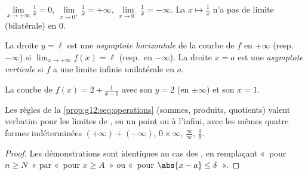 \begin{example}
$\lim\limits_{x\to+\infty} \frac{1}{x} = 0$,
$\lim\limits_{x\to 0^+} \frac{1}{x} = +\infty$,
$\lim\limits_{x\to 0^-} \frac{1}{x} = -\infty$. La 
$x \mapsto \frac1x$ n'a pas de limite (bilatérale) en $0$.
\end{example}

\begin{definition}[Asymptotes]\label{def:g12:limcont:asymptote}
La droite $y = \ell$ est une \emph{asymptote horizontale}
de la courbe de $f$ en $+\infty$ (resp.\ $-\infty$) si
$\lim_{x\to+\infty} f(x) = \ell$ (resp.\ en $-\infty$). La droite $x = a$
est une \emph{asymptote verticale} si $f$ a une limite infinie unilatérale
en $a$.
\end{definition}

\begin{omfigure}

{\small La courbe de $f(x) = 2 + \frac{1}{x-1}$ avec son  $y = 2$ (en $\pm\infty$) et son  $x = 1$.}
\end{omfigure}

\begin{proposition}\label{prop:g12:limcont:operations}
Les règles de la \cref{prop:g12:seq:operations} (sommes, produits,
quotients) valent verbatim pour les limites de , en un point ou à
l'infini, avec les mêmes quatre formes indéterminées
$(+\infty)+(-\infty)$, $0\times\infty$, $\frac{\infty}{\infty}$,
$\frac{0}{0}$.
\end{proposition}

\begin{proof}
Les démonstrations sont identiques au cas des , en remplaçant
«~pour $n \geq N$~» par «~pour $x \geq A$~» ou «~pour
$\abs{x-a} \leq \delta$~».
\end{proof}

